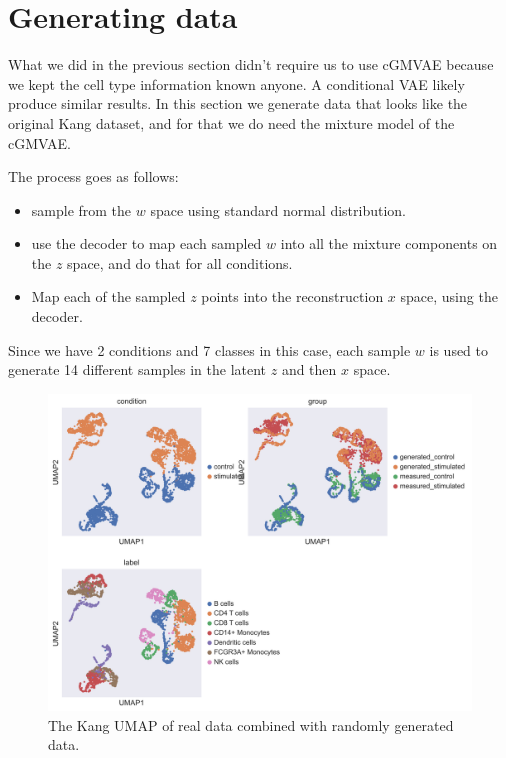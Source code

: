 \documentclass[11pt, a4paper]{report}
\theoremstyle{plain}
\theoremstyle{definition}
\theoremstyle{remark}
\begin{document}
\section{Generating data}

What we did in the previous section didn't require us to use cGMVAE because we
kept the cell type information known anyone. A conditional VAE likely produce
similar results.
In this section we generate data that looks like the original Kang dataset, and
for that we do need the mixture model of the cGMVAE.

The process goes as follows:
\begin{itemize}
\item{} sample from the $w$ space using standard normal distribution.
\item{} use the decoder to map each sampled $w$ into all the mixture components
on the $z$ space, and do that for all conditions.
\item{} Map each of the sampled $z$ points into the reconstruction $x$ space,
using the decoder.
\end{itemize}

Since we have 2 conditions and
7 classes in this case, each sample $w$ is used to generate 14 different samples
in the latent $z$ and then $x$ space.

\begin{figure}[h]
\centering
\includegraphics[width=1.1\textwidth]{images/Kang_generated_data.png}
\caption{
The Kang UMAP of real data combined with randomly generated data.
}
\label{fig:Kang_generated_data}
\end{figure}
\end{document}
